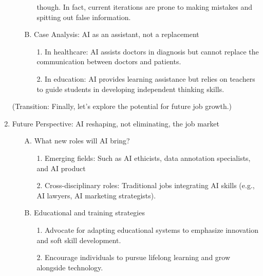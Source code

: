 \documentclass{article}
\begin{document}
\begin{enumerate}
\begin{enumerate}
\begin{enumerate}
                   though. In fact, current iterations are prone to making 
                   mistakes and spitting out false information.
            \end{enumerate}
            \item[B.] Case Analysis: AI as an assistant, not a replacement
            \begin{enumerate}
                  \item[1.] In healthcare: AI assists doctors in diagnosis
                   but cannot replace the communication between doctors and 
                   patients.
                  \item[2.] In education: AI provides learning assistance 
                  but relies on teachers to guide students in developing 
                  independent thinking skills. 
            \end{enumerate}
      \end{enumerate}
      (Transition: Finally, let's explore the potential for future job growth.)
      \item Future Perspective: AI reshaping, not eliminating, the job market
      \begin{enumerate}
            \item [A.] What new roles will AI bring?
            \begin{enumerate}
                  \item [1.] Emerging fields: Such as AI ethicists, data 
                  annotation specialists, and AI product
                  \item [2.] Cross-disciplinary roles: Traditional jobs 
                  integrating AI skills (e.g., AI lawyers, AI marketing 
                  strategists).
            \end{enumerate}
            \item [B.] Educational and training strategies
            \begin{enumerate}
                  \item [1.]  Advocate for adapting educational 
                  systems to emphasize innovation and soft skill development.
                  \item [2.]  Encourage individuals to pursue lifelong 
                  learning and grow alongside technology.
            \end{enumerate}
      \end{enumerate}
\end{enumerate}
\end{document}
